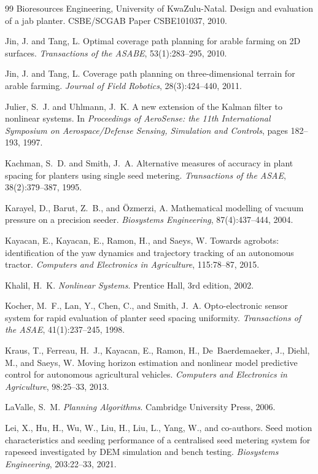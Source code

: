 \begin{thebibliography}{99}
Bioresources Engineering, University of KwaZulu-Natal.
Design and evaluation of a jab planter.
CSBE/SCGAB Paper CSBE101037, 2010.

Jin, J. and Tang, L.
Optimal coverage path planning for arable farming on 2D surfaces.
\textit{Transactions of the ASABE}, 53(1):283--295, 2010.

Jin, J. and Tang, L.
Coverage path planning on three-dimensional terrain for arable farming.
\textit{Journal of Field Robotics}, 28(3):424--440, 2011.

Julier, S.~J. and Uhlmann, J.~K.
A new extension of the Kalman filter to nonlinear systems.
In \textit{Proceedings of AeroSense: the 11th International Symposium on Aerospace/Defense Sensing, Simulation and Controls}, pages 182--193, 1997.

Kachman, S.~D. and Smith, J.~A.
Alternative measures of accuracy in plant spacing for planters using single seed metering.
\textit{Transactions of the ASAE}, 38(2):379--387, 1995.

Karayel, D., Barut, Z.~B., and {\"O}zmerzi, A.
Mathematical modelling of vacuum pressure on a precision seeder.
\textit{Biosystems Engineering}, 87(4):437--444, 2004.

Kayacan, E., Kayacan, E., Ramon, H., and Saeys, W.
Towards agrobots: identification of the yaw dynamics and trajectory tracking of an autonomous tractor.
\textit{Computers and Electronics in Agriculture}, 115:78--87, 2015.

Khalil, H.~K.
\textit{Nonlinear Systems}.
Prentice Hall, 3rd edition, 2002.

Kocher, M.~F., Lan, Y., Chen, C., and Smith, J.~A.
Opto-electronic sensor system for rapid evaluation of planter seed spacing uniformity.
\textit{Transactions of the ASAE}, 41(1):237--245, 1998.

Kraus, T., Ferreau, H.~J., Kayacan, E., Ramon, H., De~Baerdemaeker, J., Diehl, M., and Saeys, W.
Moving horizon estimation and nonlinear model predictive control for autonomous agricultural vehicles.
\textit{Computers and Electronics in Agriculture}, 98:25--33, 2013.

LaValle, S.~M.
\textit{Planning Algorithms}.
Cambridge University Press, 2006.

Lei, X., Hu, H., Wu, W., Liu, H., Liu, L., Yang, W., and co-authors.
Seed motion characteristics and seeding performance of a centralised seed metering system for rapeseed investigated by DEM simulation and bench testing.
\textit{Biosystems Engineering}, 203:22--33, 2021.


\end{thebibliography}
